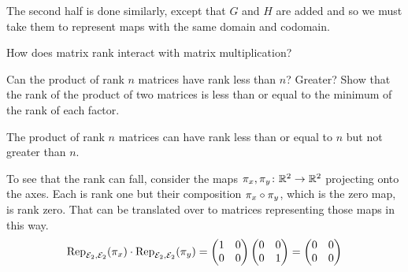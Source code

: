 \begin{exercises}
\begin{answer}
      The second half is done similarly, except that $G$ and $H$ are added 
      and so we must take them to represent maps with the same domain 
      and codomain.
    \end{answer}
  \item \label{exer:RankProdLeqRankFacts}
    How does matrix rank interact with matrix multiplication?
    \begin{exparts}
      \partsitem Can the product of rank \( n \) matrices have rank less 
        than \( n \)?
        Greater?
      \partsitem  Show that the rank of the product of two matrices is less 
        than or equal to the minimum of the rank of each factor.
    \end{exparts}
    \begin{answer}
     \begin{exparts}
      \partsitem The product of rank \( n \) matrices can have rank less 
        than or equal to \( n \) but not greater than \( n \).

        To see that the rank can fall,
        consider the maps \( \map{\pi_x,\pi_y}{\Re^2}{\Re^2} \) projecting onto
        the axes. 
        Each is rank one but their composition
        $\composed{\pi_x}{\pi_y}$, which is the zero map, is rank zero.
        That can be translated over to matrices representing those 
        maps in this way.
        \begin{equation*}
          \rep{\pi_x}{\stdbasis_2,\stdbasis_2}\cdot\rep{\pi_y}{\stdbasis_2,\stdbasis_2}=
          \begin{pmatrix}
            1  &0  \\
            0  &0
          \end{pmatrix}
          \begin{pmatrix}
            0  &0  \\
            0  &1
          \end{pmatrix}=
          \begin{pmatrix}
            0  &0  \\
            0  &0
          \end{pmatrix}
        \end{equation*}


\end{exparts}
\end{answer}
\end{exercises}
